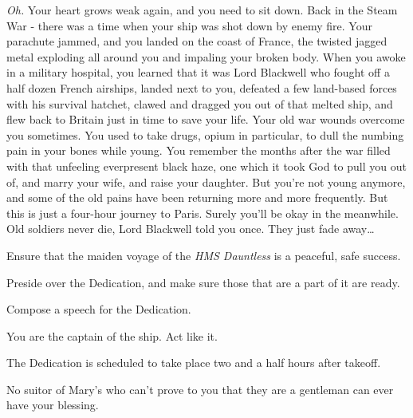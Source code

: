\documentclass[char]{guildcamp1}
\begin{document}
{\it Oh.} Your heart grows weak again, and you need to sit down. Back in
the Steam War - there was a time when your ship was shot down by enemy
fire. Your parachute jammed, and you landed on the coast of France,
the twisted jagged metal exploding all around you and impaling your
broken body. When you awoke in a military hospital, you learned that
it was Lord Blackwell who fought off a half dozen French airships, landed
next to you, defeated a few land-based forces with his survival
hatchet, clawed and dragged you out of that melted ship, and flew
back to Britain just in time to save your life. Your old war wounds
overcome you sometimes. You used to take drugs, opium in particular,
to dull the numbing pain in your bones while young. You remember the
months after the war filled with that unfeeling everpresent black
haze, one which it took God to pull you out of, and marry your wife,
and raise your daughter. But you're not young anymore, and some of the
old pains have been returning more and more frequently. But this is
just a four-hour journey to Paris. Surely you'll be okay in the
meanwhile. Old soldiers never die, Lord Blackwell told you once. They just
fade away{\ldots}

\begin{itemz}[Goals]
  \item Ensure that the maiden voyage of the {\it HMS Dauntless} is a peaceful, safe success.
  \item Preside over the Dedication, and make sure those that are a part of it are ready.
  \item Compose a speech for the Dedication.
\end{itemz}

\begin{itemz}[Notes]
  \item You are the captain of the ship. Act like it.
  \item The Dedication is scheduled to take place two and a half hours after takeoff.
  \item No suitor of Mary's who can't prove to you that they are a gentleman can ever have your blessing.
\end{itemz}
\end{document}
